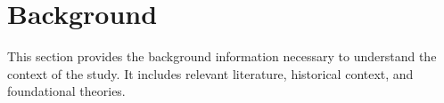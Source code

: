 \section{Background}

This section provides the background information necessary to understand the context of the study. It includes relevant literature, historical context, and foundational theories.

